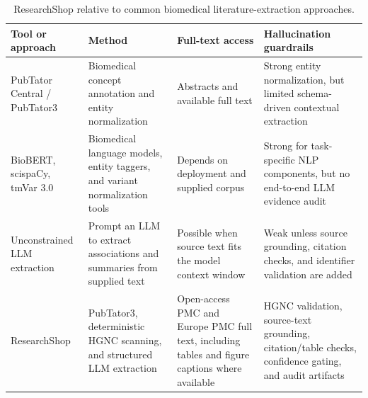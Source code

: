 \begin{table}[t]
\centering
\small
\setlength{\tabcolsep}{4pt}
\begin{tabularx}{\textwidth}{>{\raggedright\arraybackslash}p{2.8cm} >{\raggedright\arraybackslash}X >{\raggedright\arraybackslash}p{2.4cm} >{\raggedright\arraybackslash}X}
\toprule
\textbf{Tool or approach} & \textbf{Method} & \textbf{Full-text access} & \textbf{Hallucination guardrails} \\
\midrule
PubTator Central / PubTator3 & Biomedical concept annotation and entity normalization & Abstracts and available full text & Strong entity normalization, but limited schema-driven contextual extraction \\
BioBERT, scispaCy, tmVar 3.0 & Biomedical language models, entity taggers, and variant normalization tools & Depends on deployment and supplied corpus & Strong for task-specific NLP components, but no end-to-end LLM evidence audit \\
Unconstrained LLM extraction & Prompt an LLM to extract associations and summaries from supplied text & Possible when source text fits the model context window & Weak unless source grounding, citation checks, and identifier validation are added \\
ResearchShop & PubTator3, deterministic HGNC scanning, and structured LLM extraction & Open-access PMC and Europe PMC full text, including tables and figure captions where available & HGNC validation, source-text grounding, citation/table checks, confidence gating, and audit artifacts \\
\bottomrule
\end{tabularx}
\caption{ResearchShop relative to common biomedical literature-extraction approaches.}
\label{tab:tool_comparison}
\end{table}
